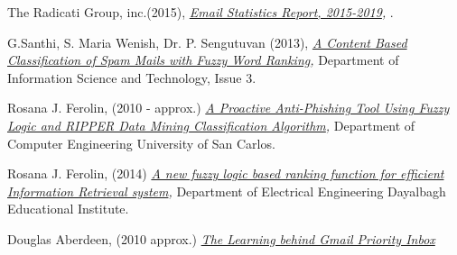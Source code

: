 \documentclass[journal]{IEEEtran}
\begin{document}
\begin{thebibliography}{9}
    The Radicati Group, inc.(2015),
    \textit{
        \href{https://github.com/Menziess/Fuzzy-Logic-Email-Classification/raw/master/report/res/a_new_fuzzy_logic_based_ranking_function_for_efficient_information_retrieval_system.pdf}{Email Statistics Report, 2015-2019},
    }.

    G.Santhi, S. Maria Wenish, Dr. P. Sengutuvan (2013),
    \textit{
        \href{https://github.com/Menziess/Fuzzy-Logic-Email-Classification/raw/master/report/res/a_content_based_classification_of_spam_mails_with_fuzzy_word_ranking.pdf}{A Content Based Classification of Spam Mails with Fuzzy Word Ranking},
    }
    Department of Information Science and Technology,
    Issue 3.

    Rosana J. Ferolin, (2010 - approx.)
    \textit{
        \href{https://github.com/Menziess/Fuzzy-Logic-Email-Classification/raw/master/report/res/a_proactive_anti-phishing_tool_using_fuzzy_logic_and_ripper_data_mining_classification_algorithm.pdf}{A Proactive Anti-Phishing Tool Using Fuzzy Logic and RIPPER Data Mining Classification Algorithm},
    }
    Department of Computer Engineering University of San Carlos.

    Rosana J. Ferolin, (2014)
    \textit{
        \href{https://github.com/Menziess/Fuzzy-Logic-Email-Classification/raw/master/report/res/a_new_fuzzy_logic_based_ranking_function_for_efficient_information_retrieval_system.pdf}{A new fuzzy logic based ranking function for efficient Information Retrieval system},
    }
    Department of Electrical Engineering Dayalbagh Educational Institute.

    Douglas Aberdeen, (2010 approx.)
    \textit{
        \href{[nog toevoegen}{The Learning behind Gmail Priority Inbox}
    }
    
\end{thebibliography}
\end{document}
